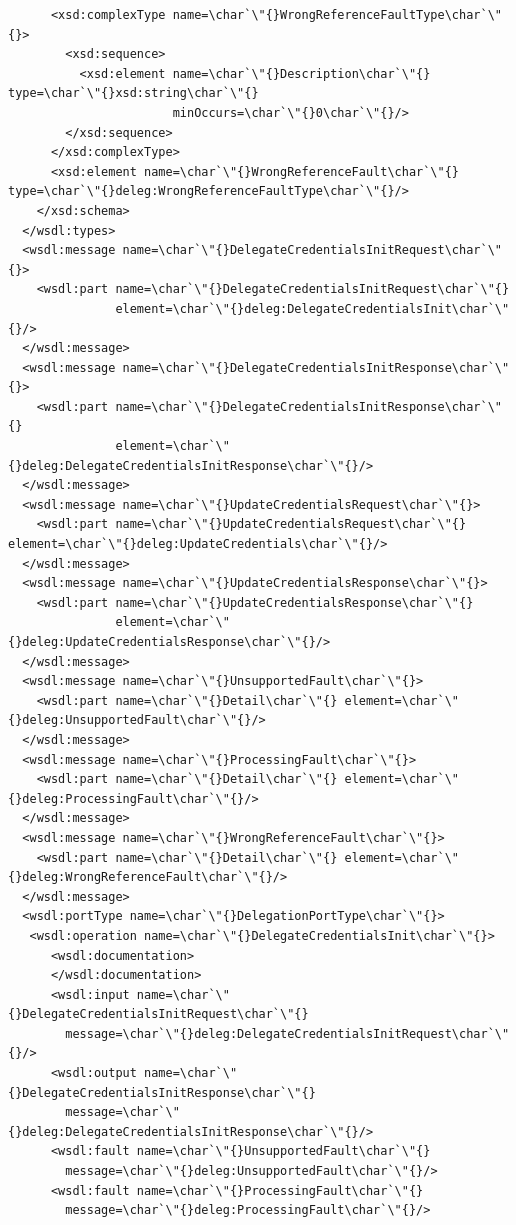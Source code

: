 \documentclass{article}                            %
\begin{document}
\begin{footnotesize}
\begin{verbatim}
      <xsd:complexType name=\char`\"{}WrongReferenceFaultType\char`\"{}>
        <xsd:sequence>
          <xsd:element name=\char`\"{}Description\char`\"{} type=\char`\"{}xsd:string\char`\"{}
                       minOccurs=\char`\"{}0\char`\"{}/>
        </xsd:sequence>
      </xsd:complexType>
      <xsd:element name=\char`\"{}WrongReferenceFault\char`\"{} type=\char`\"{}deleg:WrongReferenceFaultType\char`\"{}/>
    </xsd:schema>
  </wsdl:types>
  <wsdl:message name=\char`\"{}DelegateCredentialsInitRequest\char`\"{}>
    <wsdl:part name=\char`\"{}DelegateCredentialsInitRequest\char`\"{}
               element=\char`\"{}deleg:DelegateCredentialsInit\char`\"{}/>
  </wsdl:message>
  <wsdl:message name=\char`\"{}DelegateCredentialsInitResponse\char`\"{}>
    <wsdl:part name=\char`\"{}DelegateCredentialsInitResponse\char`\"{}
               element=\char`\"{}deleg:DelegateCredentialsInitResponse\char`\"{}/>
  </wsdl:message>
  <wsdl:message name=\char`\"{}UpdateCredentialsRequest\char`\"{}>
    <wsdl:part name=\char`\"{}UpdateCredentialsRequest\char`\"{} element=\char`\"{}deleg:UpdateCredentials\char`\"{}/>
  </wsdl:message>
  <wsdl:message name=\char`\"{}UpdateCredentialsResponse\char`\"{}>
    <wsdl:part name=\char`\"{}UpdateCredentialsResponse\char`\"{}
               element=\char`\"{}deleg:UpdateCredentialsResponse\char`\"{}/>
  </wsdl:message>
  <wsdl:message name=\char`\"{}UnsupportedFault\char`\"{}>
    <wsdl:part name=\char`\"{}Detail\char`\"{} element=\char`\"{}deleg:UnsupportedFault\char`\"{}/>
  </wsdl:message>
  <wsdl:message name=\char`\"{}ProcessingFault\char`\"{}>
    <wsdl:part name=\char`\"{}Detail\char`\"{} element=\char`\"{}deleg:ProcessingFault\char`\"{}/>
  </wsdl:message>
  <wsdl:message name=\char`\"{}WrongReferenceFault\char`\"{}>
    <wsdl:part name=\char`\"{}Detail\char`\"{} element=\char`\"{}deleg:WrongReferenceFault\char`\"{}/>
  </wsdl:message>
  <wsdl:portType name=\char`\"{}DelegationPortType\char`\"{}>
   <wsdl:operation name=\char`\"{}DelegateCredentialsInit\char`\"{}>
      <wsdl:documentation>
      </wsdl:documentation>
      <wsdl:input name=\char`\"{}DelegateCredentialsInitRequest\char`\"{}
        message=\char`\"{}deleg:DelegateCredentialsInitRequest\char`\"{}/>
      <wsdl:output name=\char`\"{}DelegateCredentialsInitResponse\char`\"{}
        message=\char`\"{}deleg:DelegateCredentialsInitResponse\char`\"{}/>
      <wsdl:fault name=\char`\"{}UnsupportedFault\char`\"{}
        message=\char`\"{}deleg:UnsupportedFault\char`\"{}/>
      <wsdl:fault name=\char`\"{}ProcessingFault\char`\"{}
        message=\char`\"{}deleg:ProcessingFault\char`\"{}/>

\end{verbatim}
\end{footnotesize}
\end{document}
